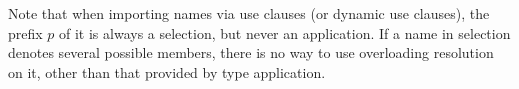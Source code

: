 Note that when importing names via use clauses (or dynamic use clauses), the prefix $p$ of it is always a selection, but never an application. If a name in selection denotes several possible members, there is no way to use overloading resolution on it, other than that provided by type application. 





